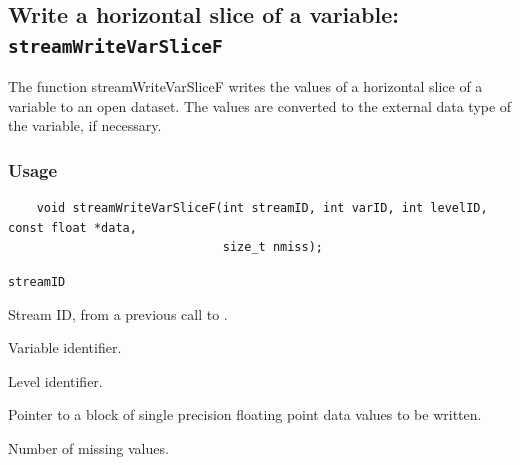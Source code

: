 \subsection{Write a horizontal slice of a variable: \texttt{streamWriteVarSliceF}}
\label{streamWriteVarSliceF}

The function streamWriteVarSliceF writes the values of a horizontal slice of a variable to an open dataset.
The values are converted to the external data type of the variable, if necessary.
\subsubsection*{Usage}

\begin{verbatim}
    void streamWriteVarSliceF(int streamID, int varID, int levelID, const float *data, 
                              size_t nmiss);
\end{verbatim}

\hspace*{4mm}\begin{minipage}[]{15cm}
\begin{deflist}{\texttt{streamID}\ }
\item[\texttt{streamID}]
Stream ID, from a previous call to {}.
\item[\texttt{varID}]
Variable identifier.
\item[\texttt{levelID}]
Level identifier.
\item[\texttt{data}]
Pointer to a block of single precision floating point data values to be written.
\item[\texttt{nmiss}]
Number of missing values.

\end{deflist}
\end{minipage}
